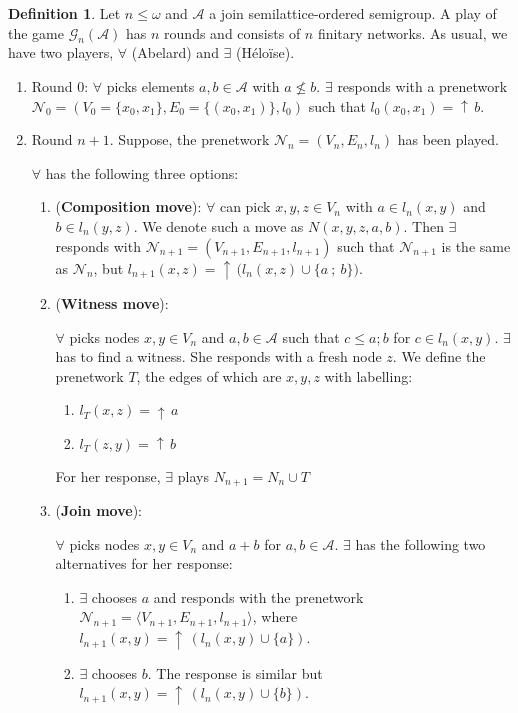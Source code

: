 \documentclass[a4paper]{article}
\theoremstyle{definition}
\newtheorem{definition}{Definition}
\theoremstyle{theorem}
\theoremstyle{proposition}
\theoremstyle{lemma}
\theoremstyle{ex}
\theoremstyle{corollary}
\theoremstyle{claim}
\newcommand{\up}[1]{\ensuremath{{\uparrow}\,#1}}
\begin{document}
\begin{definition}
  Let $n \leq \omega$ and $\mathcal{A}$ a join semilattice-ordered semigroup. A play of the game $\mathcal{G}_n(\mathcal{A})$ has $n$ rounds and consists of $n$ finitary networks. As usual, we have two players, $\forall$ (Abelard) and $\exists$ (H\'{e}lo\"{i}se).

  \begin{enumerate}
    \item Round $0$: $\forall$ picks elements $a, b \in \mathcal{A}$ with $a \not\leq b$. $\exists$ responds with a prenetwork $\mathcal{N}_0 = (V_0 = \{ x_0, x_1 \}, E_0 = \{ (x_0, x_1)\}, l_0)$ such that $l_0(x_0, x_1) = \up{b}$.
    \item Round $n + 1$. Suppose, the prenetwork $\mathcal{N}_n = (V_n, E_n, l_n)$ has been played.

    $\forall$ has the following three options:
    \begin{enumerate}
      \item ({\bf Composition move}): $\forall$ can pick $x, y, z \in V_n$ with $a \in l_n(x, y)$ and $b \in l_n(y, z)$. We denote such a move as $N(x,y,z,a,b)$. Then $\exists$ responds with $\mathcal{N}_{n + 1} = (V_{n + 1}, E_{n + 1}, l_{n + 1})$ such that $\mathcal{N}_{n + 1}$
      is the same as $\mathcal{N}_n$, but $l_{n + 1}(x, z) = \up{(l_{n}(x, z)} \cup \{ a \: ; \: b\})$.
      \item ({\bf Witness move}):

      $\forall$ picks nodes $x, y \in V_n$ and $a, b \in \mathcal{A}$ such that $c \leq a ; b$ for $c \in l_n(x, y)$. $\exists$ has to find a witness. She responds with a fresh node $z$. We define the prenetwork $T$, the edges of which are $x, y, z$ with labelling:
      \begin{enumerate}
        \item $l_T(x, z) = \up{a}$
        \item $l_T(z, y) = \up{b}$
      \end{enumerate}
      For her response, $\exists$ plays $N_{n + 1} = N_n \cup T$
      \item ({\bf Join move}):

      $\forall$ picks nodes $x, y \in V_n$ and $a + b$ for $a, b \in \mathcal{A}$. $\exists$ has the following two alternatives for her response:
      \begin{enumerate}
        \item $\exists$ chooses $a$ and responds with the prenetwork $\mathcal{N}_{n + 1} = \langle V_{n + 1}, E_{n + 1}, l_{n + 1} \rangle$, where $l_{n+1}(x, y) = \up{(l_n(x,y) \cup \{ a \})}$.
        \item $\exists$ chooses $b$. The response is similar but $l_{n + 1}(x, y) = \up{(l_n(x,y) \cup \{ b \})}$.
      \end{enumerate}
    \end{enumerate}
  \end{enumerate}


\end{definition}
\end{document}
